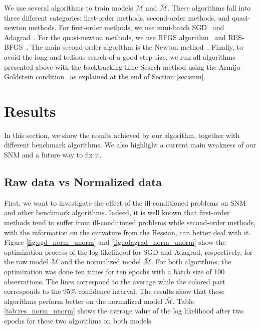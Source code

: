 \documentclass[conference]{IEEEtran}
\begin{document}
We use several algorithms to train models $\mathcal{M}$ and $\bar{\mathcal{M}}$. These algorithms fall into three different categories: first-order methods, second-order methods, and quasi-newton methods. For first-order methods, we use mini-batch SGD~\cite{ruder_overview_2016} and Adagrad~\cite{duchi_adaptive_2011}. For the quasi-newton methods, we use BFGS algorithm~\cite{fletcher_practical_1987} and RES-BFGS~\cite{mokhtari_res:_2014}. The main second-order algorithm is the Newton method~\cite{caswell_treatise_1685}. Finally, to avoid the long and tedious search of a good step size, we run all algorithms presented above with the backtracking Line Search method using the Armijo-Goldstein condition~\cite{armijo_minimization_1966} as explained at the end of Section \ref{sec:snm}. \\

\section{Results}
\label{sec:res}

In this section, we show the results achieved by our algorithm, together with different benchmark algorithms. We also highlight a current main weakness of our SNM and a future way to fix it.

\subsection{Raw data vs Normalized data}
\label{sec:norm_unorm}

First, we want to investigate the effect of the ill-conditioned problems on SNM and other benchmark algorithms. Indeed, it is well known that first-order methods tend to suffer from ill-conditioned problems while second-order methods, with the information on the curvature from the Hessian, can better deal with it. Figure \ref{fig:sgd_norm_unorm} and \ref{fig:adagrad_norm_unorm} show the optimization process of the log likelihood for SGD and Adagrad, respectively, for the raw model $\mathcal{M}$ and the normalized model $\bar{\mathcal{M}}$. For both algorithms, the optimization was done ten times for ten epochs with a batch size of 100 observations. The lines correspond to the average while the colored part corresponds to the 95\% confidence interval. The results show that these algorithms perform better on the normalized model $\bar{\mathcal{M}}$. Table \ref{tab:res_norm_unorm} shows the average value of the log likelihood after two epochs for these two algorithms on both models.
\end{document}
